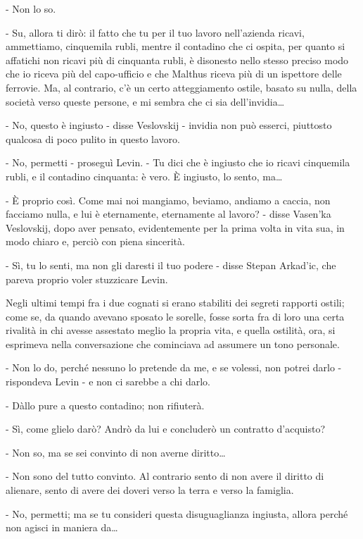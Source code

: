 - Non lo so. 

- Su, allora ti dirò: il fatto che tu per il tuo lavoro nell'azienda ricavi, ammettiamo, cinquemila rubli, mentre il contadino che ci ospita, per quanto si affatichi non ricavi più di cinquanta rubli, è disonesto nello stesso preciso modo che io riceva più del capo-ufficio e che Malthus riceva più di un ispettore delle ferrovie. Ma, al contrario, c'è un certo atteggiamento ostile, basato su nulla, della società verso queste persone, e mi sembra che ci sia dell'invidia\ldots{} 

- No, questo è ingiusto - disse Veslovskij - invidia non può esserci, piuttosto qualcosa di poco pulito in questo lavoro. 

- No, permetti - proseguì Levin. - Tu dici che è ingiusto che io ricavi cinquemila rubli, e il contadino cinquanta: è vero. È ingiusto, lo sento, ma\ldots{} 

- È proprio così. Come mai noi mangiamo, beviamo, andiamo a caccia, non facciamo nulla, e lui è eternamente, eternamente al lavoro? - disse Vasen'ka Veslovskij, dopo aver pensato, evidentemente per la prima volta in vita sua, in modo chiaro e, perciò con piena sincerità. 

- Sì, tu lo senti, ma non gli daresti il tuo podere - disse Stepan Arkad'ic, che pareva proprio voler stuzzicare Levin. 

Negli ultimi tempi fra i due cognati si erano stabiliti dei segreti rapporti ostili; come se, da quando avevano sposato le sorelle, fosse sorta fra di loro una certa rivalità in chi avesse assestato meglio la propria vita, e quella ostilità, ora, si esprimeva nella conversazione che cominciava ad assumere un tono personale. 

- Non lo do, perché nessuno lo pretende da me, e se volessi, non potrei darlo - rispondeva Levin - e non ci sarebbe a chi darlo. 

- Dàllo pure a questo contadino; non rifiuterà. 

- Sì, come glielo darò? Andrò da lui e concluderò un contratto d'acquisto? 

- Non so, ma se sei convinto di non averne diritto\ldots{} 

- Non sono del tutto convinto. Al contrario sento di non avere il diritto di alienare, sento di avere dei doveri verso la terra e verso la famiglia. 

- No, permetti; ma se tu consideri questa disuguaglianza ingiusta, allora perché non agisci in maniera da\ldots{} 

